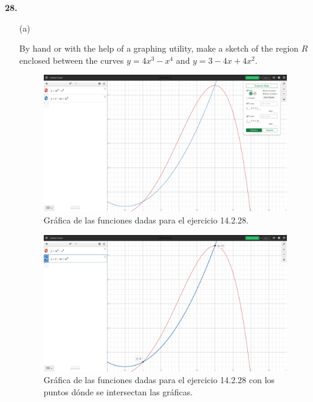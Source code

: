 \documentclass[11pt]{report}
\begin{document}
\textbf{28.} \\
\begin{itemize}
	\item[(a)] {
		By hand or with the help of a graphing utility, make a sketch of the region
		$R$ enclosed between the curves $y = 4x^3 - x^4$ and $y = 3 - 4x + 4x^2$. \\
		\begin{figure}
			\includegraphics[scale=0.2]{A-B-D_14_2_28_a.png}
			\caption{Gráfica de las funciones dadas para el ejercicio 14.2.28.}
			\centering
		\end{figure}
		\begin{figure}
			\includegraphics[scale=0.2]{images/A-B-D_14_2_28_b.png}
			\caption{Gráfica de las funciones dadas para el ejercicio 14.2.28 con los puntos
					dónde se intersectan las gráficas.}
			\centering
		\end{figure}
	}


\end{itemize}
\end{document}
